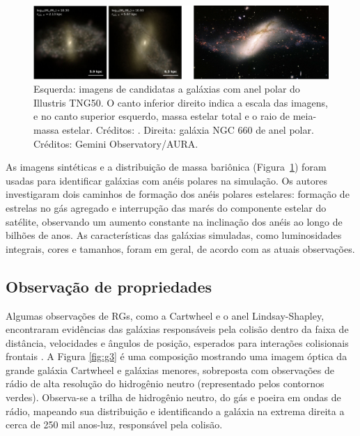 \begin{figure}[h]
  \centering 
  \includegraphics[width=1.0\textwidth]{Imagens/2024prg.PNG} 
  \caption[Simulações cosmológicas de galáxias com anéis polares.]{Esquerda: imagens de candidatas a galáxias com anel polar do Illustris TNG50. O canto inferior direito indica a escala das imagens, e no canto superior esquerdo, massa estelar total e o raio de meia-massa estelar. Créditos: . Direita: galáxia NGC 660 de anel polar. Créditos: Gemini Observatory/AURA.}
  \label{fig:2024prg} 
\end{figure}

As imagens sintéticas e a distribuição de massa bariônica (Figura~\ref{fig:2024prg}) foram usadas para identificar galáxias com anéis polares na simulação. Os autores investigaram dois caminhos de formação dos anéis polares estelares: formação de estrelas no gás agregado e interrupção das marés do componente estelar do satélite, observando um aumento constante na inclinação dos anéis ao longo de bilhões de anos. As características das galáxias simuladas, como luminosidades integrais, cores e tamanhos, foram em geral, de acordo com as atuais observações.

\subsection{Observação de propriedades}

Algumas observações de RGs, como a Cartwheel e o anel Lindsay-Shapley, encontraram evidências das galáxias responsáveis pela colisão dentro da faixa de distância, velocidades e ângulos de posição, esperados para interações colisionais frontais \cite{1977MNRAS.178..473F, 2009madore}. A Figura \ref{fig:g3} é uma composição mostrando uma imagem óptica da grande galáxia Cartwheel e galáxias menores, sobreposta com observações de rádio de alta resolução do hidrogênio neutro (representado pelos contornos verdes). Observa-se a trilha de hidrogênio neutro, do gás e poeira em ondas de rádio, mapeando sua distribuição e identificando a galáxia na extrema direita a cerca de 250 mil anos-luz, responsável pela colisão.

